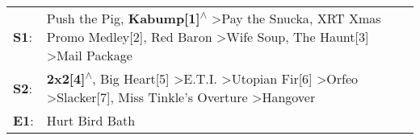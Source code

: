 \begin{supertabular}{p{0.03\textwidth}p{0.92\textwidth}}
 \textbf{S1}:  &        Push the Pig\textsuperscript{}, \enspace \textbf{Kabump[1]\textsuperscript{$\wedge$}} \textgreater \enspace Pay the Snucka\textsuperscript{}, \enspace XRT Xmas Promo Medley[2]\textsuperscript{}, \enspace Red Baron\textsuperscript{} \textgreater \enspace Wife Soup\textsuperscript{}, \enspace The Haunt[3]\textsuperscript{} \textgreater \enspace Mail Package\textsuperscript{}  \enspace  \\
 \textbf{S2}:  &  \textbf{2x2[4]\textsuperscript{$\wedge$}}, \enspace Big Heart[5]\textsuperscript{} \textgreater \enspace E.T.I.\textsuperscript{} \textgreater \enspace Utopian Fir[6]\textsuperscript{} \textgreater \enspace Orfeo\textsuperscript{} \textgreater \enspace Slacker[7]\textsuperscript{}, \enspace Miss Tinkle's Overture\textsuperscript{} \textgreater \enspace Hangover\textsuperscript{}  \enspace  \\
 \textbf{E1}:  &                                                                                                                                                                                                                                                                                                                                                               Hurt Bird Bath\textsuperscript{}  \enspace  \\
\end{supertabular}
